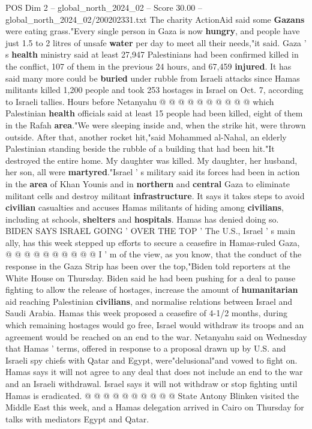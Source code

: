 \begin{textsample}{POS Dim 2 – global\_north\_2024\_02 – Score 30.00 – global\_north\_2024\_02/200202331.txt}
The charity ActionAid said some \textbf{Gazans} were eating grass."Every single person in Gaza is now \textbf{hungry}, and people have just 1.5 to 2 litres of unsafe \textbf{water} per day to meet all their needs,"it said.
Gaza ' s \textbf{health} ministry said at least 27,947 Palestinians had been confirmed killed in the conflict, 107 of them in the previous 24 hours, and 67,459 \textbf{injured}.
It has said many more could be \textbf{buried} under rubble from Israeli attacks since Hamas militants killed 1,200 people and took 253 hostages in Israel on Oct. 7, according to Israeli tallies.
Hours before Netanyahu @ @ @ @ @ @ @ @ @ @ which Palestinian \textbf{health} officials said at least 15 people had been killed, eight of them in the Rafah \textbf{area}."We were sleeping inside and, when the strike hit, were thrown outside.
After that, another rocket hit,"said Mohammed al-Nahal, an elderly Palestinian standing beside the rubble of a building that had been hit."It destroyed the entire home.
My daughter was killed.
My daughter, her husband, her son, all were \textbf{martyred}."Israel ' s military said its forces had been in action in the \textbf{area} of Khan Younis and in \textbf{northern} and \textbf{central} Gaza to eliminate militant cells and destroy militant \textbf{infrastructure}.
It says it takes steps to avoid \textbf{civilian} casualties and accuses Hamas militants of hiding among \textbf{civilians}, including at schools, \textbf{shelters} and \textbf{hospitals}.
Hamas has denied doing so.
BIDEN SAYS ISRAEL GOING ' OVER THE TOP ' The U.S., Israel ' s main ally, has this week stepped up efforts to secure a ceasefire in Hamas-ruled Gaza, @ @ @ @ @ @ @ @ @ @ I ' m of the view, as you know, that the conduct of the response in the Gaza Strip has been over the top,"Biden told reporters at the White House on Thursday.
Biden said he had been pushing for a deal to pause fighting to allow the release of hostages, increase the amount of \textbf{humanitarian} aid reaching Palestinian \textbf{civilians}, and normalise relations between Israel and Saudi Arabia.
Hamas this week proposed a ceasefire of 4-1/2 months, during which remaining hostages would go free, Israel would withdraw its troops and an agreement would be reached on an end to the war.
Netanyahu said on Wednesday that Hamas ' terms, offered in response to a proposal drawn up by U.S. and Israeli spy chiefs with Qatar and Egypt, were"delusional"and vowed to fight on.
Hamas says it will not agree to any deal that does not include an end to the war and an Israeli withdrawal.
Israel says it will not withdraw or stop fighting until Hamas is eradicated. @ @ @ @ @ @ @ @ @ @ State Antony Blinken visited the Middle East this week, and a Hamas delegation arrived in Cairo on Thursday for talks with mediators Egypt and Qatar.

\end{textsample}
